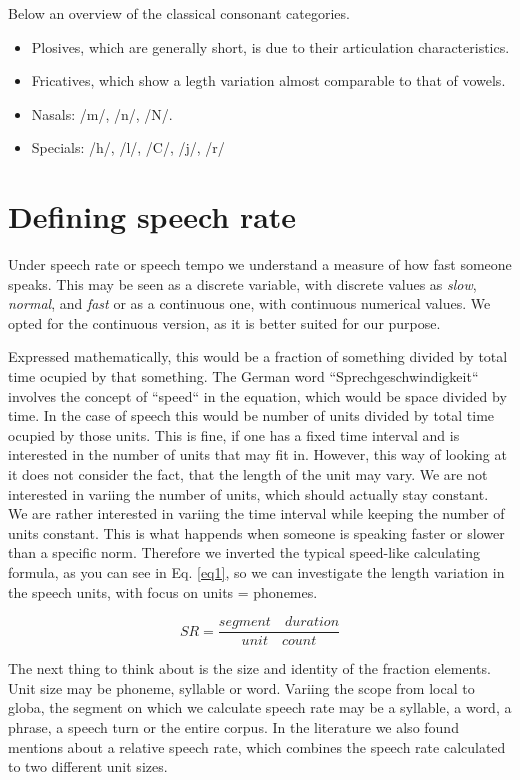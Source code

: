 \documentclass[a4paper]{scrreprt}
\begin{document}
Below an overview of the classical consonant categories.
\begin{itemize}
	\item Plosives, which are generally short, is due to their articulation characteristics.
	\item Fricatives, which show a legth variation almost comparable to that of vowels.
	\item Nasals: /m/, /n/, /N/.
	\item Specials: /h/, /l/, /C/, /j/, /r/
\end{itemize}


\chapter{Defining speech rate}
Under speech rate or speech tempo we understand a measure of how fast someone speaks. This may be seen as a discrete variable, with discrete values as \textit{slow}, \textit{normal}, and \textit{fast} or as a continuous one, with continuous numerical values.  We opted for the continuous version, as it is better suited for our purpose.

Expressed mathematically, this would be a fraction of something divided by total time ocupied by that something. The German word ``Sprechgeschwindigkeit`` involves the concept of ``speed`` in the equation, which would be space divided by time. In the case of speech this would be number of units divided by total time ocupied by those units. This is fine, if one has a fixed time interval and is interested in the number of units that may fit in. However, this way of looking at it does not consider the fact, that the length of the unit may vary. We are not interested in variing the number of units, which should actually stay constant. We are rather interested in variing the time interval while keeping the number of units constant. This is what happends when someone is speaking faster or slower than a specific norm. Therefore we inverted the typical speed-like calculating formula, as you can see in Eq. \ref{eq1}, so we can investigate the length variation in the speech units, with focus on units = phonemes.

\begin{equation}
\label{eq1}
	SR = \frac{segment \quad duration}{unit\quad count}
\end{equation}

The next thing to think about is the size and identity of the fraction elements. Unit size may be phoneme, syllable or word. Variing the scope from local to globa, the segment on which we calculate speech rate may be a syllable, a word, a phrase, a speech turn or the entire corpus. In the literature \cite{Pfitzinger1998} we also found mentions about a relative speech rate, which combines the speech rate calculated to two different unit sizes.
\end{document}
